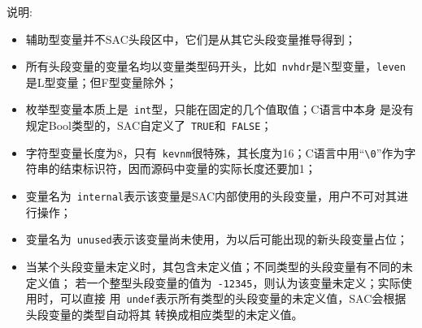 说明:

\begin{itemize}
\item 辅助型变量并不SAC头段区中，它们是从其它头段变量推导得到；
\item 所有头段变量的变量名均以变量类型码开头，比如~\verb+nvhdr+是N型变量，\verb+leven+是L型变量；但F型变量除外；
\item 枚举型变量本质上是~\verb+int+型，只能在固定的几个值取值；C语言中本身
是没有规定Bool类型的，SAC自定义了~\verb+TRUE+和~\verb+FALSE+；
\item 字符型变量长度为8，只有~\verb+kevnm+很特殊，其长度为16；C语言中用``\verb+\0+''作为字符串的结束标识符，因而源码中变量的实际长度还要加1；
\item 变量名为~\verb+internal+表示该变量是SAC内部使用的头段变量，用户不可对其进行操作；
\item 变量名为~\verb+unused+表示该变量尚未使用，为以后可能出现的新头段变量占位；
\item 当某个头段变量未定义时，其包含未定义值；不同类型的头段变量有不同的未定义值；
    若一个整型头段变量的值为~\verb+-12345+，则认为该变量未定义；实际使用时，可以直接
    用~\verb+undef+表示所有类型的头段变量的未定义值，SAC会根据头段变量的类型自动将其
    转换成相应类型的未定义值。
\end{itemize}
